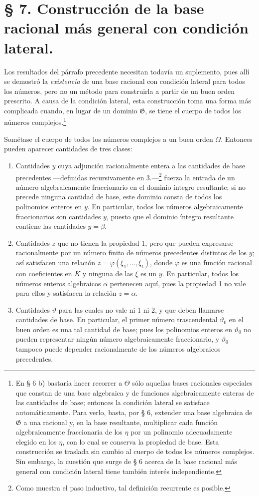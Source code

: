 \section*{§ 7. Construcción de la base racional más general con condición lateral.}

Los resultados del párrafo precedente necesitan todavía un suplemento, pues allí se demostró la \emph{existencia} de una base racional con condición lateral para todos los números, pero no un método para construirla a partir de un buen orden prescrito. A causa de la condición lateral, esta construcción toma una forma más complicada cuando, en lugar de un dominio $\mathfrak G$, se tiene el cuerpo de todos los números complejos.\footnote{En § 6 b) bastaría hacer recorrer a $\Theta$ sólo aquellas bases racionales especiales que constan de una base algebraica y de funciones algebraicamente enteras de las cantidades de base; entonces la condición lateral se satisface automáticamente. Para verlo, basta, por § 6, extender una base algebraica de $\mathfrak G$ a una racional y, en la base resultante, multiplicar cada función algebraicamente fraccionaria de los $\eta$ por un polinomio adecuadamente elegido en los $\eta$, con lo cual se conserva la propiedad de base. Esta construcción se traslada sin cambio al cuerpo de todos los números complejos. Sin embargo, la cuestión que surge de § 6 acerca de la base racional más general con condición lateral tiene también interés independiente.}

Sométase el cuerpo de todos los números complejos a un buen orden $\Omega$. Entonces pueden aparecer cantidades de tres clases:
\begin{enumerate}
\item[1.] Cantidades $y$ cuya adjunción racionalmente entera a las cantidades de base precedentes ---definidas recursivamente en 3.---\footnote{Como muestra el paso inductivo, tal definición recurrente es posible.} fuerza la entrada de un número algebraicamente fraccionario en el dominio íntegro resultante; si no precede ninguna cantidad de base, este dominio consta de todos los polinomios enteros en $y$. En particular, todos los números algebraicamente fraccionarios son cantidades $y$, puesto que el dominio íntegro resultante contiene las cantidades $y=\beta$.
\item[2.] Cantidades $z$ que no tienen la propiedad 1, pero que pueden expresarse racionalmente por un número finito de números precedentes distintos de los $y$; así satisfacen una relación $z=\varphi(\xi_1,\ldots,\xi_t)$, donde $\varphi$ es una función racional con coeficientes en $K$ y ninguna de las $\xi$ es un $y$. En particular, todos los números enteros algebraicos $\alpha$ pertenecen aquí, pues la propiedad 1 no vale para ellos y satisfacen la relación $z=\alpha$.
\item[3.] Cantidades $\vartheta$ para las cuales no vale ni 1 ni 2, y que deben llamarse cantidades de base. En particular, el primer número trascendental $\vartheta_0$ en el buen orden es una tal cantidad de base; pues los polinomios enteros en $\vartheta_0$ no pueden representar ningún número algebraicamente fraccionario, y $\vartheta_0$ tampoco puede depender racionalmente de los números algebraicos precedentes.
\end{enumerate}

